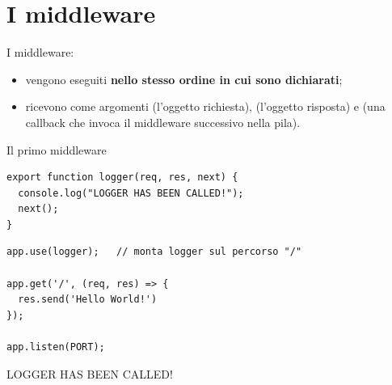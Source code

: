 \section{I middleware}


I middleware:

\begin{itemize}
  \item vengono eseguiti \textbf{nello stesso ordine in cui sono dichiarati};
  \item ricevono come argomenti  (l'oggetto richiesta), 
        (l'oggetto risposta) e  (una callback che invoca il
        middleware successivo nella pila).
\end{itemize}

\begin{esempio}{Il primo middleware}
\begin{affianco}[0.45]
\begin{lstlisting}[style=js, name=middleware.js]
export function logger(req, res, next) {
  console.log("LOGGER HAS BEEN CALLED!");
  next();
}
\end{lstlisting}
\risultato
\begin{lstlisting}[style=js, name=index.js]
app.use(logger);   // monta logger sul percorso "/"

app.get('/', (req, res) => {
  res.send('Hello World!')
});

app.listen(PORT);
\end{lstlisting}
\begin{console}
LOGGER HAS BEEN CALLED!
\end{console}
\end{affianco}
\end{esempio}


